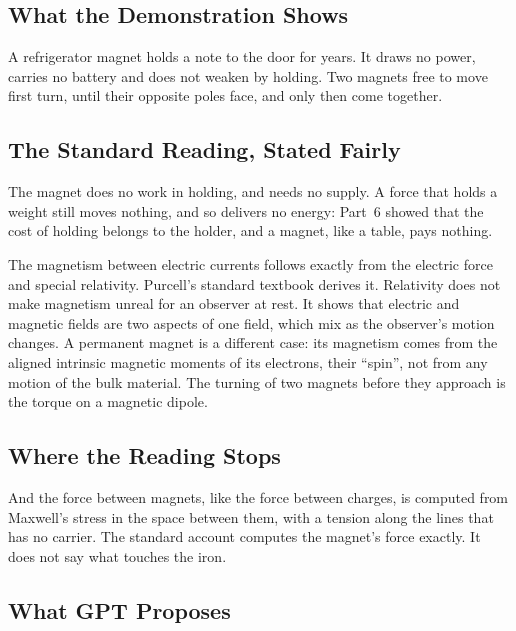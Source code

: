\subsection*{What the Demonstration Shows}

A refrigerator magnet holds a note to the door for years. It draws no power, carries no battery and does not weaken by holding. Two magnets free to move first turn, until their opposite poles face, and only then come together.

\subsection*{The Standard Reading, Stated Fairly}

The magnet does no work in holding, and needs no supply. A force that holds a weight still moves nothing, and so delivers no energy: Part~6 showed that the cost of holding belongs to the holder, and a magnet, like a table, pays nothing.

The magnetism between electric currents follows exactly from the electric force and special relativity. Purcell's standard textbook derives it. Relativity does not make magnetism unreal for an observer at rest. It shows that electric and magnetic fields are two aspects of one field, which mix as the observer's motion changes. A permanent magnet is a different case: its magnetism comes from the aligned intrinsic magnetic moments of its electrons, their ``spin'', not from any motion of the bulk material. The turning of two magnets before they approach is the torque on a magnetic dipole.

\subsection*{Where the Reading Stops}

 And the force between magnets, like the force between charges, is computed from Maxwell's stress in the space between them, with a tension along the lines that has no carrier. The standard account computes the magnet's force exactly. It does not say what touches the iron.

\subsection*{What GPT Proposes}

